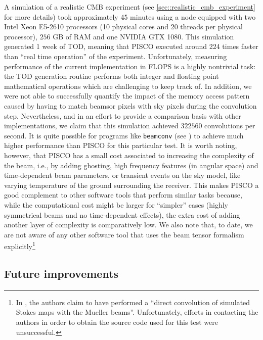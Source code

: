 \documentclass[a4paper,11pt]{article}
\begin{document}
A simulation of a realistic CMB experiment (see \ref{sec::realistic_cmb_experiment} for more details) took approximately 45 minutes using a node equipped with two Intel Xeon E5-2610 processors (10 physical cores and 20 threads per physical processor), $256$ GB of RAM and one NVIDIA GTX 1080. This simulation generated 1 week of TOD, meaning that PISCO executed around 224 times faster than ``real time operation'' of the experiment. Unfortunately, measuring performance of the current implementation in FLOPS is a highly nontrivial task: the TOD generation routine performs both integer and floating point mathematical operations which are challenging to keep track of. In addition, we were not able to successfully quantify the impact of the memory access pattern caused by having to match beamsor pixels with sky pixels during the convolution step. Nevertheless, and in an effort to provide a comparison basis with other implementations, we claim that this simulation achieved $322560$ convolutions per second. It is quite possible for programs like \texttt{beamconv} (see \cite{2018arXiv180905034D}) to achieve much higher performance than PISCO for this particular test. It is worth noting, however, that PISCO has a small cost associated to increasing the complexity of the beam, i.e., by adding ghosting, high frequency features (in angular space) and time-dependent beam parameters, or transient events on the sky model, like varying temperature of the ground surrounding the receiver. This makes PISCO a good complement to other software tools that perform similar tasks because, while the computational cost might be larger for ``simpler'' cases (highly symmetrical beams and no time-dependent effects), the extra cost of adding another layer of complexity is comparatively low. We also note that, to date, we are not aware of any other software tool that uses the beam tensor formalism explicitly\footnote{In \cite{2007MNRAS.376.1767O}, the authors claim to have performed a ``direct convolution of simulated Stokes maps with the Mueller beams''. Unfortunately, efforts in contacting the authors in order to obtain the source code used for this test were unsuccessful.}

\subsection{Future improvements}
\end{document}
